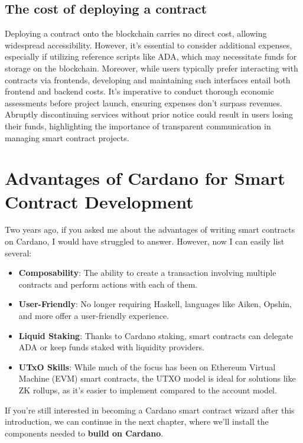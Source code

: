 \subsection{The cost of deploying a contract}

Deploying a contract onto the blockchain carries no direct cost, allowing widespread accessibility. However, it's essential to consider additional expenses, especially if utilizing reference scripts like ADA, which may necessitate funds for storage on the blockchain. Moreover, while users typically prefer interacting with contracts via frontends, developing and maintaining such interfaces entail both frontend and backend costs. It's imperative to conduct thorough economic assessments before project launch, ensuring expenses don't surpass revenues. Abruptly discontinuing services without prior notice could result in users losing their funds, highlighting the importance of transparent communication in managing smart contract projects.
\section{Advantages of Cardano for Smart Contract Development}

Two years ago, if you asked me about the advantages of writing smart contracts on Cardano, I would have struggled to answer. However, now I can easily list several:

\begin{itemize}
  \item \textbf{\gls{Composability}}: The ability to create a transaction involving multiple contracts and perform actions with each of them.
  \item \textbf{User-Friendly}: No longer requiring Haskell, languages like Aiken, Opshin, and more offer a user-friendly experience.
  \item \textbf{\gls{Liquid Staking}}: Thanks to Cardano staking, smart contracts can delegate ADA or keep funds staked with liquidity providers.
  \item \textbf{UTxO Skills}: While much of the focus has been on Ethereum Virtual Machine (EVM) smart contracts, the UTXO model is ideal for solutions like ZK rollups, as it's easier to implement compared to the account model.
\end{itemize}

If you're still interested in becoming a Cardano smart contract wizard after this introduction, we can continue in the next chapter, where we'll install the components needed to \textbf{build on Cardano}.
